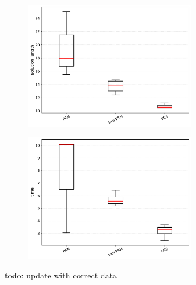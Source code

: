 \begin{figure}[!t]
    \centering
    \begin{subfigure}[b]{\linewidth}
        \centering
        \includegraphics[width=0.8\textwidth]{figures/solution_length_boxplot.pdf}
        \captionsetup{justification=centering}
        \label{subfig:}
    \end{subfigure}
    \begin{subfigure}[b]{\linewidth}
        \centering
        \includegraphics[width=0.8\textwidth]{figures/time_boxplot.pdf}
        \captionsetup{justification=centering}
        \label{subfig:}
    \end{subfigure}
    \caption{ {\color{red} todo: update with correct data} }
    \label{fig:}
\end{figure}


